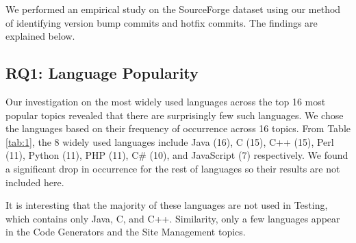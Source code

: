 \documentclass{sig-alternate}
\begin{document}
We performed an empirical study on the SourceForge dataset using our method of identifying version bump commits and hotfix commits. The findings are explained below.
\subsection{RQ1: Language Popularity}
Our investigation on the most widely used languages across the top 16 most popular topics revealed that there are surprisingly few such languages. We chose the languages based on their frequency of occurrence across 16 topics. From Table \ref{tab:1}, the 8 widely used languages include Java (16), C (15), C++ (15), Perl (11), Python (11), PHP (11), C\# (10), and JavaScript (7) respectively.  We found a significant drop in occurrence for the rest of languages so their results are not included here.  %

It is interesting that the majority of these languages are not used in Testing, which contains only Java, C, and C++. Similarity, only a few languages appear in the Code Generators and the Site Management topics.

\end{document}
